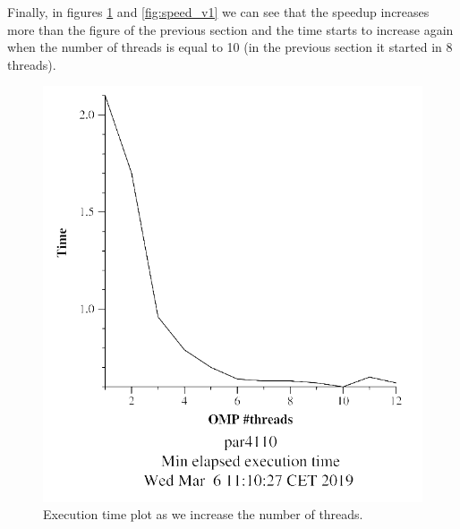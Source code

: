 \documentclass[12pt, a4paper]{article}
\begin{document}
Finally, in figures \ref{fig:min_v1} and \ref{fig:speed_v1} we can see that the speedup increases more than the figure of the previous section and the time starts to increase again when the number of threads is equal to 10 (in the previous section it started in 8 threads).

\begin{figure}[H]
\begin{minipage}[b]{0.45\linewidth}
\centering
\includegraphics[width=\textwidth]{./images/min_v2}
\caption{Execution time plot as we increase the number of threads.}
\label{fig:min_v1}
\end{minipage}
\hspace{0.5cm}
\begin{minipage}[b]{0.45\linewidth}
\centering

\end{minipage}
\end{figure}
\end{document}
